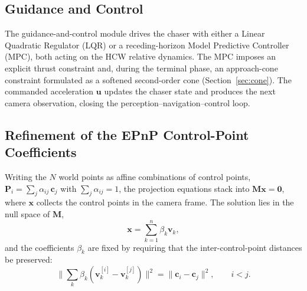 \subsection{Guidance and Control}

The guidance-and-control module drives the chaser with either a Linear
Quadratic Regulator (LQR) or a receding-horizon Model Predictive Controller
(MPC), both acting on the HCW relative dynamics. The MPC imposes an explicit
thrust constraint and, during the terminal phase, an approach-cone constraint
formulated as a softened second-order cone (Section~\ref{sec:cone}). The
commanded acceleration $\mathbf{u}$ updates the chaser state and produces the
next camera observation, closing the perception--navigation--control loop.

\subsection{Refinement of the EPnP Control-Point Coefficients}
\label{sec:epnp_gn}

Writing the $N$ world points as affine combinations of control points,
$\mathbf{P}_i = \sum_{j} \alpha_{ij}\,\mathbf{c}_j$ with
$\sum_j \alpha_{ij} = 1$, the projection equations stack into
$\mathbf{M}\mathbf{x} = \mathbf{0}$, where $\mathbf{x}$ collects the control
points in the camera frame. The solution lies in the null space of
$\mathbf{M}$,
\begin{equation}
\mathbf{x} = \sum_{k=1}^{n} \beta_k \mathbf{v}_k ,
\label{eq:epnp_null}
\end{equation}
and the coefficients $\beta_k$ are fixed by requiring that the
inter-control-point distances be preserved:
\begin{equation}
\bigl\| \textstyle\sum_k \beta_k (\mathbf{v}_k^{[i]} - \mathbf{v}_k^{[j]}) \bigr\|^2
= \| \mathbf{c}_i - \mathbf{c}_j \|^2 ,
\qquad i < j .
\label{eq:epnp_dist}
\end{equation}

